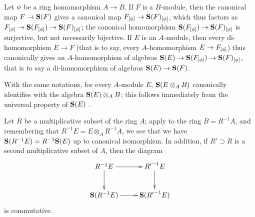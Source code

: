 \begin{env}[1.7.2]
\label{2.1.7.2}
Let $\phi$ be a ring homomorphism $A\to B$.
If $F$ is a $B$-module, then the canonical map $F\to\bb{S}(F)$ gives a canonical map $F_{[\vphi]}\to\bb{S}(F)_{[\vphi]}$, which thus factors as $F_{[\vphi]}\to\bb{S}(F_{[\vphi]})\to\bb{S}(F)_{[\vphi]}$; the canonical homomorphism $\bb{S}(F_{[\vphi]})\to\bb{S}(F)_{[\vphi]}$ is surjective, but not necessarily bijective.
If $E$ is an $A$-module, then every di-homomorphism $E\to F$ (that is to say, every $A$-homomorphism $E\to F_{[\vphi]}$) thus canonically gives an $A$-homomorphism of algebras $\bb{S}(E)\to\bb{S}(F_{[\vphi]})\to\bb{S}(F)_{[\vphi]}$, that is to say a di-homomorphism of algebras $\bb{S}(E)\to\bb{S}(F)$.

With the same notations, for every $A$-module $E$, $\mathbf{S}(E\otimes_A B)$ canonically identifies with the algebra $\mathbf{S}(E)\otimes_A B$; this follows immediately from the universal property of $\mathbf{S}(E)$ .
\end{env}

\begin{env}[1.7.3]
\label{2.1.7.3}
Let $R$ be a multiplicative subset of the ring $A$; apply  to the ring $B=R^{-1}A$, and remembering that $R^{-1}E=E\otimes_A R^{-1}A$, we see that we have $\mathbf{S}(R^{-1}E)=R^{-1}\mathbf{S}(E)$ up to canonical isomorphism.
In addition, if $R'\supset R$ is a second multiplicative subset of $A$, then the diagram
\[
  \xymatrix{
    {R^{-1}E}\ar[r]\ar[d] & {{R'}^{-1}E}\ar[d]\\
    {\bb{S}(R^{-1}E)}\ar[r] & {\bb{S}({R'}^{-1}E)}
  }
\]
is commutative.
\end{env}

